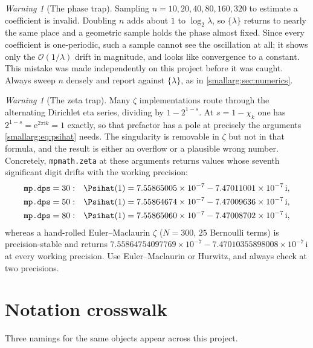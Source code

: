 \documentclass[11pt,oneside]{article}
\theoremstyle{definition}
\theoremstyle{remark}
\newtheorem{warning}[theorem]{Warning}
\newcommand{\e}{\mathrm e}
\newcommand{\ii}{\mathrm i}
\newcommand{\bigO}{\mathcal O}
\begin{document}
\begin{warning}[The phase trap]
Sampling $n=10,20,40,80,160,320$ to estimate a coefficient is invalid.  Doubling
$n$ adds about $1$ to $\log_2\lambda$, so $\{\lambda\}$ returns to nearly the
same place and a geometric sample holds the phase almost fixed.  Since every
coefficient is one-periodic, such a sample cannot see the oscillation at all;
it shows only the $\bigO(1/\lambda)$ drift in magnitude, and looks like
convergence to a constant.  This mistake was made independently on this project
before it was caught.  Always sweep $n$ densely and report against
$\{\lambda\}$, as in \cref{smallarg:sec:numerics}.
\end{warning}

\begin{warning}[The zeta trap]
Many $\zeta$ implementations route through the alternating Dirichlet eta
series, dividing by $1-2^{1-s}$.  At $s=1-\chi_k$ one has
$2^{1-s}=\e^{2\pi\ii k}=1$ exactly, so that prefactor has a pole at precisely
the arguments \cref{smallarg:eq:psihat} needs.  The singularity is removable in $\zeta$
but not in that formula, and the result is either an overflow or a plausible
wrong number.  Concretely, \texttt{mpmath.zeta} at these arguments returns
values whose seventh significant digit drifts with the working precision:
\[
\begin{aligned}
  \texttt{mp.dps}=30:&\quad \Psihat(1)=7.55865005\times10^{-7}-7.47011001\times10^{-7}\,\ii,\\
  \texttt{mp.dps}=50:&\quad \Psihat(1)=7.55864674\times10^{-7}-7.47009636\times10^{-7}\,\ii,\\
  \texttt{mp.dps}=80:&\quad \Psihat(1)=7.55865060\times10^{-7}-7.47008702\times10^{-7}\,\ii,
\end{aligned}
\]
whereas a hand-rolled Euler--Maclaurin $\zeta$ ($N=300$, $25$ Bernoulli terms)
is precision-stable and returns
$7.55864754097769\times10^{-7}-7.47010355898008\times10^{-7}\,\ii$ at every
working precision.  Use Euler--Maclaurin or Hurwitz, and always check at two
precisions.
\end{warning}

\section{Notation crosswalk}\label{smallarg:sec:crosswalk}

Three namings for the same objects appear across this project.
\end{document}
